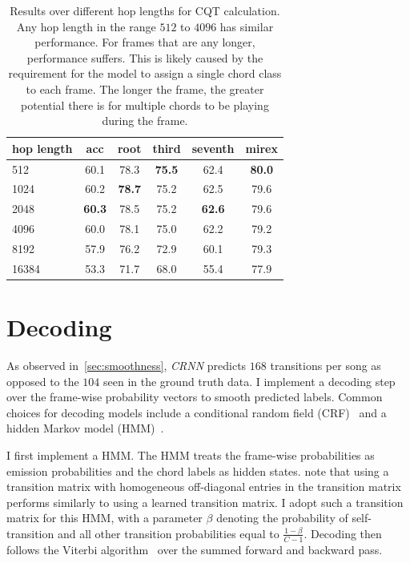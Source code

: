 \begin{table}[h]
    \centering
    \begin{tabular}{lccccc}
        \toprule
        hop length & acc & root & third & seventh & mirex \\  
        \midrule
        512 & 60.1 & 78.3 & \textbf{75.5} & 62.4 & \textbf{80.0} \\
        1024 & 60.2 & \textbf{78.7} & 75.2 & 62.5 & 79.6 \\
        2048 & \textbf{60.3} & 78.5 & 75.2 & \textbf{62.6} & 79.6 \\
        4096 & 60.0 & 78.1 & 75.0 & 62.2 & 79.2 \\
        8192 & 57.9 & 76.2 & 72.9 & 60.1 & 79.3 \\
        16384 & 53.3 & 71.7 & 68.0 & 55.4 & 77.9 \\
        \bottomrule
    \end{tabular}
    \caption{Results over different hop lengths for CQT calculation. Any hop length in the range $512$ to $4096$ has similar performance. For frames that are any longer, performance suffers. This is likely caused by the requirement for the model to assign a single chord class to each frame. The longer the frame, the greater potential there is for multiple chords to be playing during the frame. }\label{tab:hop_lengths}
\end{table}


\section{Decoding}\label{sec:decoding}

As observed in~\ref{sec:smoothness}, \emph{CRNN} predicts $168$ transitions per song as opposed to the $104$ seen in the ground truth data. I implement a decoding step over the frame-wise probability vectors to smooth predicted labels. Common choices for decoding models include a conditional random field (CRF)~\citep{ACRLargeVocab1, BTC} and a hidden Markov model (HMM)~\citep{BalanceRandomForestACR}. 

I first implement a HMM. The HMM treats the frame-wise probabilities as emission probabilities and the chord labels as hidden states. \citet{CQTvsChroma} note that using a transition matrix with homogeneous off-diagonal entries in the transition matrix performs similarly to using a learned transition matrix. I adopt such a transition matrix for this HMM, with a parameter $\beta$ denoting the probability of self-transition and all other transition probabilities equal to $\frac{1-\beta}{C-1}$. Decoding then follows the Viterbi algorithm~\citep{Viterbi} over the summed forward and backward pass.

